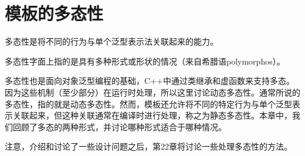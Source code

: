\chapter{模板的多态性}
多态性是将不同的行为与单个泛型表示法关联起来的能力。

\begin{notice}
多态性字面上指的是具有多种形式或形状的情况（来自希腊语polymorphos）。
\end{notice}

多态性也是面向对象泛型编程的基础，C++中通过类继承和虚函数来支持多态。因为这些机制（至少部分）在运行时处理，所以这里讨论动态多态性。通常所说的多态性，指的就是动态多态性。然而，模板还允许将不同的特定行为与单个泛型表示关联起来，但这种关联通常在编译时进行处理，称之为静态多态性。本章中，我们回顾了多态的两种形式，并讨论哪种形式适合于哪种情况。

注意，介绍和讨论了一些设计问题之后，第22章将讨论一些处理多态性的方法。






